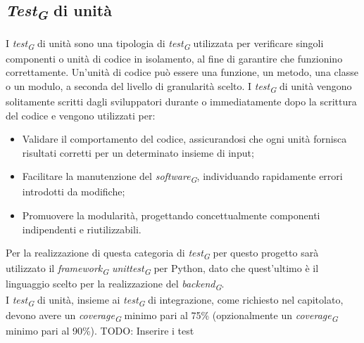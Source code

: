 \subsection{\textit{Test\textsubscript{G}} di unità}
I \textit{test\textsubscript{G}} di unità sono una tipologia di \textit{test\textsubscript{G}} utilizzata per verificare singoli componenti o unità di codice in isolamento, al fine di garantire che funzionino correttamente. Un'unità di codice può essere una funzione, un metodo, una classe o un modulo, a seconda del livello di granularità scelto. I \textit{test\textsubscript{G}} di unità vengono solitamente scritti dagli sviluppatori durante o immediatamente dopo la scrittura del codice e vengono utilizzati per:
\begin{itemize}
    \item Validare il comportamento del codice, assicurandosi che ogni unità fornisca risultati corretti per un determinato insieme di input;
    \item Facilitare la manutenzione del \textit{software\textsubscript{G}}, individuando rapidamente errori introdotti da modifiche;
    \item Promuovere la modularità, progettando concettualmente componenti indipendenti e riutilizzabili.
\end{itemize}
Per la realizzazione di questa categoria di \textit{test\textsubscript{G}} per questo progetto sarà utilizzato il \textit{framework\textsubscript{G}} \textit{unittest\textsubscript{G}} per Python, dato che quest'ultimo è il linguaggio scelto per la realizzazione del \textit{backend\textsubscript{G}}.\\
I \textit{test\textsubscript{G}} di unità, insieme ai \textit{test\textsubscript{G}} di integrazione, come richiesto nel capitolato, devono avere un \textit{coverage\textsubscript{G}} minimo pari al 75\% (opzionalmente un \textit{coverage\textsubscript{G}} minimo pari al 90\%).
TODO: Inserire i test
